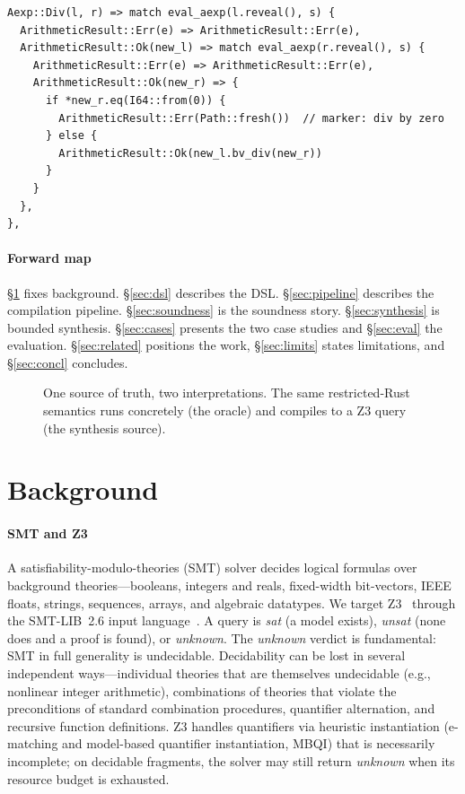 \documentclass[sigplan,review,anonymous]{acmart}
\theoremstyle{definition}
\theoremstyle{remark}
\newcommand{\imp}{IMP}
\begin{document}
\begin{lstlisting}[style=rust,caption={The division case of \imp{}'s evaluator.},
label={lst:div}]
Aexp::Div(l, r) => match eval_aexp(l.reveal(), s) {
  ArithmeticResult::Err(e) => ArithmeticResult::Err(e),
  ArithmeticResult::Ok(new_l) => match eval_aexp(r.reveal(), s) {
    ArithmeticResult::Err(e) => ArithmeticResult::Err(e),
    ArithmeticResult::Ok(new_r) => {
      if *new_r.eq(I64::from(0)) {
        ArithmeticResult::Err(Path::fresh())  // marker: div by zero
      } else {
        ArithmeticResult::Ok(new_l.bv_div(new_r))
      }
    }
  },
},
\end{lstlisting}

\paragraph{Forward map}
\S\ref{sec:bg} fixes background. \S\ref{sec:dsl} describes the DSL.
\S\ref{sec:pipeline} describes the compilation pipeline.
\S\ref{sec:soundness} is the soundness story. \S\ref{sec:synthesis} is bounded
synthesis. \S\ref{sec:cases} presents the two case studies and
\S\ref{sec:eval} the evaluation. \S\ref{sec:related} positions the work,
\S\ref{sec:limits} states limitations, and \S\ref{sec:concl} concludes.

\begin{figure}[t]
\centering
\resizebox{0.92\columnwidth}{!}{}
\caption{One source of truth, two interpretations. The same restricted-Rust
semantics runs concretely (the oracle) and compiles to a Z3 query (the synthesis
source).}
\label{fig:dual}
\end{figure}

\section{Background}
\label{sec:bg}

\paragraph{SMT and Z3}
A satisfiability-modulo-theories (SMT) solver decides logical formulas over
background theories---booleans, integers and reals, fixed-width bit-vectors, IEEE
floats, strings, sequences, arrays, and algebraic datatypes. We target
Z3~\cite{demoura2008z3} through the SMT-LIB~2.6 input
language~\cite{barrett2017smtlib}. A query is \emph{sat} (a model exists),
\emph{unsat} (none does and a proof is found), or \emph{unknown}. The
\emph{unknown} verdict is fundamental: SMT in full generality is undecidable.
Decidability can be lost in several independent ways---individual theories that
are themselves undecidable (e.g., nonlinear integer arithmetic), combinations of
theories that violate the preconditions of standard combination procedures,
quantifier alternation, and recursive function definitions. Z3 handles
quantifiers via heuristic instantiation (e-matching and model-based quantifier
instantiation, MBQI) that is necessarily incomplete; on decidable fragments, the
solver may still return \emph{unknown} when its resource budget is exhausted.
\end{document}
